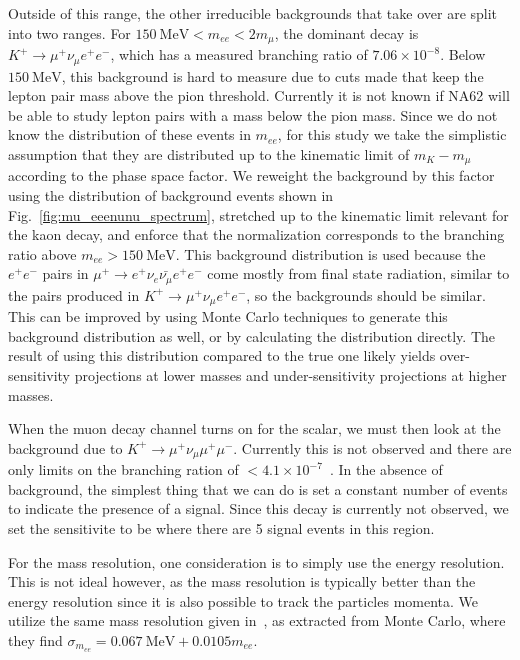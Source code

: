 Outside of this range, the other irreducible backgrounds that take over are split into two ranges.
For $150~\textrm{MeV} < m_{ee} < 2m_\mu$, the dominant decay is $K^+ \rightarrow \mu^+ \nu_\mu e^+ e^-$, which has a measured branching ratio of $7.06 \times 10^{-8}$.
Below $150~\textrm{MeV}$, this background is hard to measure due to cuts made that keep the lepton pair mass above the pion threshold.
Currently it is not known if NA62 will be able to study lepton pairs with a mass below the pion mass.
Since we do not know the distribution of these events in $m_{ee}$, for this study we take the simplistic assumption that they are distributed up to the kinematic limit of $m_K - m_\mu$ according to the phase space factor.
We reweight the background by this factor using the distribution of background events shown in Fig.~\ref{fig:mu_eeenunu_spectrum}, stretched up to the kinematic limit relevant for the kaon decay, and enforce that the normalization corresponds to the branching ratio above $m_{ee} > 150~\textrm{MeV}$.
This background distribution is used because the $e^+ e^-$ pairs in $\mu^+ \rightarrow e^+ \nu_e \bar{\nu_\mu} e^+ e^-$ come mostly from final state radiation, similar to the pairs produced in $K^+ \rightarrow \mu^+ \nu_\mu e^+ e^-$, so the backgrounds should be similar.
This can be improved by using Monte Carlo techniques to generate this background distribution as well, or by calculating the distribution directly.
The result of using this distribution compared to the true one likely yields over-sensitivity projections at lower masses and under-sensitivity projections at higher masses.

When the muon decay channel turns on for the scalar, we must then look at the background due to $K^+ \rightarrow \mu^+ \nu_\mu \mu^+ \mu^-$.
Currently this is not observed and there are only limits on the branching ration of $< 4.1 \times 10^{-7}$~\cite{Agashe:2014kda}.
In the absence of background, the simplest thing that we can do is set a constant number of events to indicate the presence of a signal.
Since this decay is currently not observed, we set the sensitivite to be where there are 5 signal events in this region.

For the mass resolution, one consideration is to simply use the energy resolution.
This is not ideal however, as the mass resolution is typically better than the energy resolution since it is also possible to track the particles momenta.
We utilize the same mass resolution given in~\cite{Batley:2015lha}, as extracted from Monte Carlo, where they find $\sigma_{m_{ee}} = 0.067~\textrm{MeV} + 0.0105 m_{ee}$.

